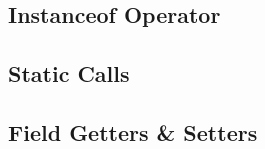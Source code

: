 \documentclass[../main.tex]{subfiles}
\begin{document}
\subsection{Instanceof Operator}

\subsection{Static Calls}

\subsection{Field Getters \& Setters}
\end{document}
